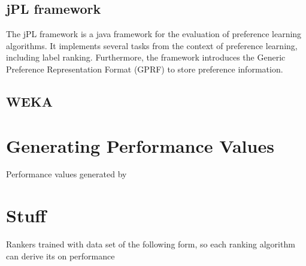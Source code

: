 \subsection{jPL framework}
The jPL framework is a java framework for the evaluation of preference learning algorithms. It implements several tasks from the context of preference learning, including label ranking. Furthermore, the framework introduces the Generic Preference Representation Format (GPRF) to store preference information.

\subsection{WEKA}


\section{Generating Performance Values}
Performance values generated by 

\section{Stuff}

Rankers trained with data set of the following form, so each ranking algorithm can derive its on performance